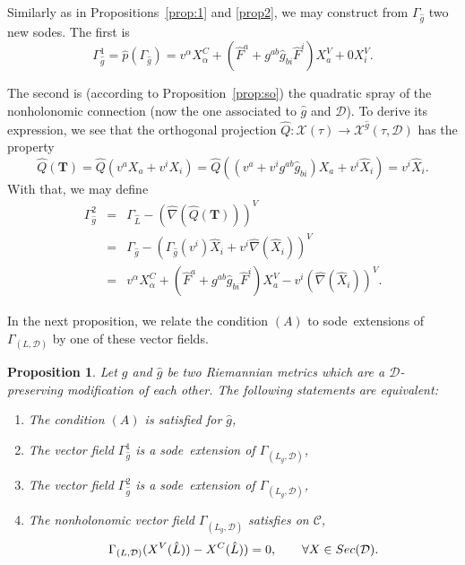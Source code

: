 \documentclass[11pt]{article}
\newtheorem{prop}{Proposition}
\def\sode{{\sc sode}}
\def\T{{\mathbf T}}
\def\D{{\mathcal D}}
\def\C{{\mathcal C}}
\def\GLD{{\Gamma_{(L,\mathcal{D})}}}
\begin{document}
Similarly as in Propositions~\ref{prop:1} and \ref{prop2}, we may construct from $\Gamma_{\hat{g}}$  two new \sode s. The first is 
\[
\Gamma_{\hat{g}}^1= \hat{p}(\Gamma_{\hat{g}}) =  v^\alpha X_\alpha^C+ ({\hat{F}}^a+g^{ab}\hat{g}_{bi}\hat{F}^i) X_a^V+0X_i^V.
\]

The second is (according to Proposition~\ref{prop:so}) the quadratic spray of the nonholonomic connection (now the one associated to $\hat g$ and $\D$). To derive its expression, we see that the orthogonal projection $\hat{Q}:\mathcal{X}(\tau)\rightarrow \mathcal{X}^{\hat g}(\tau, \mathcal{D})$ has the property
\[
\hat Q(\T)=\hat Q(v^a X_a+v^i X_i) = \hat Q((v^a+v^i g^{ab}\hat{g}_{bi}) X_a+v^i\hat{X}_i) = v^i {\hat X}_i .
\]
With that, we may define 
    \begin{eqnarray*}
        \Gamma_{\hat{g}}^2&=& \Gamma_{\hat{L}} -(\hat{\nabla}(\hat{Q}(\T)))^V\\
         &=& \Gamma_{\hat{g}}-(\Gamma_{\hat{g}}(v^i)\hat{X}_i+v^i\hat{\nabla}(\hat{X}_i))^V\\
        &=& v^\alpha X_\alpha^C+ ({\hat{F}}^a+g^{ab}\hat{g}_{bi}\hat{F}^i) X_a^V- v^i(\hat{\nabla}(\hat{X}_i))^V.
    \end{eqnarray*}


In the next proposition, we relate the condition $(A)$ to \sode\ extensions of $\GLD$ by one of these vector fields. 

\begin{prop} \label{propback1} Let $g$ and $\hat g$ be two Riemannian metrics which are a $\D$-preserving modification of each other.
 The following statements are equivalent:
 \begin{enumerate}
     \item[(i)] The condition $(A)$ is satisfied for $\hat g$,
     \item[(ii)] The vector field $\Gamma_{\hat{g}}^1$ is a \sode\  extension of $\Gamma_{(L_g,\mathcal{D})}$,
     \item[(iii)] The vector field $\Gamma_{\hat{g}}^2$ is a \sode\  extension of $\Gamma_{(L_g,\mathcal{D})}$,
     \item[(iv)] The nonholonomic vector field  $\Gamma_{(L_g,\mathcal{D})}$ satisfies on $\C$, 
		$$
		\Gamma_{(L,\mathcal{D})}(X^V(\hat{L}))-X^C(\hat{L}))=0, \qquad \forall X\in {\rm Sec}(\mathcal{D}).
		$$
 \end{enumerate}
\end{prop}
\end{document}

